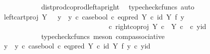 \begin{isabellebody}
\ \ \ \ \ \ \ \ \ \ \ \ \isamarkupfalse%
\ dist{\isacharunderscore}{\kern0pt}prod{\isacharunderscore}{\kern0pt}coprod{\isacharunderscore}{\kern0pt}left{\isacharunderscore}{\kern0pt}ap{\isacharunderscore}{\kern0pt}right\ \isamarkupfalse%
\ {\isacharparenleft}{\kern0pt}typecheck{\isacharunderscore}{\kern0pt}cfuncs{\isacharcomma}{\kern0pt}\ auto{\isacharparenright}{\kern0pt}\isanewline
\ \ \ \ \ \ \ \ \ \ \isamarkupfalse%
\ \isamarkupfalse%
\ {\isachardoublequoteopen}{\isachardot}{\kern0pt}{\isachardot}{\kern0pt}{\isachardot}{\kern0pt}\ {\isacharequal}{\kern0pt}\ {\isacharparenleft}{\kern0pt}{\isacharparenleft}{\kern0pt}left{\isacharunderscore}{\kern0pt}cart{\isacharunderscore}{\kern0pt}proj\ Y\ {\isasymone}\ {\isasymamalg}\ {\isacharparenleft}{\kern0pt}{\isacharparenleft}{\kern0pt}y{}\ {\isasymamalg}\ y{}{\isacharparenright}{\kern0pt}\ {\isasymcirc}\isactrlsub c\ case{\isacharunderscore}{\kern0pt}bool\ {\isasymcirc}\isactrlsub c\ eq{\isacharunderscore}{\kern0pt}pred\ Y\ {\isasymcirc}\isactrlsub c\ {\isacharparenleft}{\kern0pt}id\ Y\ {\isasymtimes}\isactrlsub f\ y{}{\isacharparenright}{\kern0pt}{\isacharparenright}{\kern0pt}{\isacharparenright}{\kern0pt}\ \isanewline
\ \ \ \ \ \ \ \ \ \ \ \ \ \ \ \ \ \ \ \ \ \ \ \ \ \ \ \ \ \ \ \ \ {\isasymcirc}\isactrlsub c\ right{\isacharunderscore}{\kern0pt}coproj\ {\isacharparenleft}{\kern0pt}Y\ {\isasymtimes}\isactrlsub c\ {\isasymone}{\isacharparenright}{\kern0pt}\ {\isacharparenleft}{\kern0pt}Y\ {\isasymtimes}\isactrlsub c\ {\isasymone}{\isacharparenright}{\kern0pt}{\isacharparenright}{\kern0pt}\ {\isasymcirc}\isactrlsub c\ {\isasymlangle}y{}{\isacharcomma}{\kern0pt}id\ {\isasymone}{\isasymrangle}{\isachardoublequoteclose}\isanewline
\ \ \ \ \ \ \ \ \ \ \ \ \isamarkupfalse%
\ {\isacharparenleft}{\kern0pt}typecheck{\isacharunderscore}{\kern0pt}cfuncs{\isacharcomma}{\kern0pt}\ meson\ comp{\isacharunderscore}{\kern0pt}associative{}{\isacharparenright}{\kern0pt}\isanewline
\ \ \ \ \ \ \ \ \ \ \isamarkupfalse%
\ \isamarkupfalse%
\ {\isachardoublequoteopen}{\isachardot}{\kern0pt}{\isachardot}{\kern0pt}{\isachardot}{\kern0pt}\ {\isacharequal}{\kern0pt}\ {\isacharparenleft}{\kern0pt}{\isacharparenleft}{\kern0pt}y{}\ {\isasymamalg}\ y{}{\isacharparenright}{\kern0pt}\ {\isasymcirc}\isactrlsub c\ case{\isacharunderscore}{\kern0pt}bool\ {\isasymcirc}\isactrlsub c\ eq{\isacharunderscore}{\kern0pt}pred\ Y\ {\isasymcirc}\isactrlsub c\ {\isacharparenleft}{\kern0pt}id\ Y\ {\isasymtimes}\isactrlsub f\ y{}{\isacharparenright}{\kern0pt}{\isacharparenright}{\kern0pt}\ {\isasymcirc}\isactrlsub c\ {\isasymlangle}y{}{\isacharcomma}{\kern0pt}id\ {\isasymone}{\isasymrangle}{\isachardoublequoteclose}\isanewline

\end{isabellebody}
